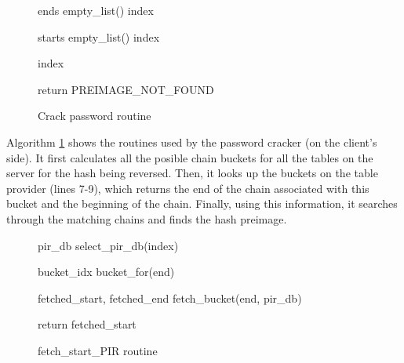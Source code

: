 \documentclass{llncs}
\begin{document}
\begin{figure} [ht]
\vspace{-0.5 cm}
\begin{algorithm}[H]
  \caption{Crack password routine}
  \label{algo:password_cracker_routines}\DontPrintSemicolon



  ends  empty\_list() \;
  index  \;

  starts  empty\_list() \;
  index  \;

  index  \;

	
  return PREIMAGE\_NOT\_FOUND
\end{algorithm}
\vspace{-0.5 cm}
\end{figure}

Algorithm \ref{algo:password_cracker_routines} shows the routines used by 
the password cracker (on the client's side). It first calculates all the posible
chain buckets for all the  tables on the server for the hash being reversed.
Then, it looks up the buckets on the table provider (lines 7-9), which returns the end of
the chain associated with this bucket and the beginning of the chain. Finally,
using this information, it searches through the matching chains and finds the hash
preimage.


\begin{figure} [ht]
\vspace{-0.5 cm}
\begin{algorithm}[H]
  \caption{fetch\_start\_PIR routine}
  \label{algo:fetch_start}\DontPrintSemicolon



  pir\_db  select\_pir\_db(index) \;

  bucket\_idx  bucket\_for(end) \;

  fetched\_start, fetched\_end  fetch\_bucket(end, pir\_db) \;

  return fetched\_start \;
\end{algorithm}

\vspace{-0.5 cm}
\end{figure}
\end{document}
